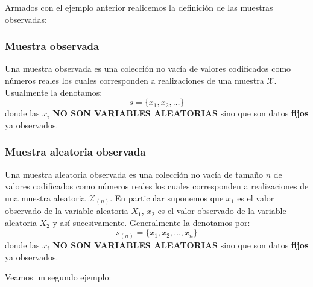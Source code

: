 \documentclass[
]{book}
\newenvironment{Definicion}
{\begin{mdframed}[
  linecolor=definicioncolor,
  skipabove=12pt,
  skipbelow=12pt,
  roundcorner=20pt,
  splittopskip=2\topsep]}
{\end{mdframed}}
\begin{document}
Armados con el ejemplo anterior realicemos la definición de las muestras observadas:

\begin{Definicion}
\hypertarget{muestra-observada}{%
\subsubsection{Muestra observada}\label{muestra-observada}}

Una muestra observada es una colección no vacía de valores codificados
como números reales los cuales corresponden a realizaciones de una
muestra \(\mathcal{X}\). Usualmente la denotamos: \[
s = \{ x_1, x_2, \dots\}
\] donde las \(x_i\) \textbf{NO SON VARIABLES ALEATORIAS} sino que son
datos \textbf{fijos} ya observados.
\end{Definicion}

\begin{Definicion}
\hypertarget{muestra-aleatoria-observada}{%
\subsubsection{Muestra aleatoria
observada}\label{muestra-aleatoria-observada}}

Una muestra aleatoria observada es una colección no vacía de tamaño
\(n\) de valores codificados como números reales los cuales corresponden
a realizaciones de una muestra aleatoria \(\mathcal{X}_{(n)}\). En
particular suponemos que \(x_1\) es el valor observado de la variable
aleatoria \(X_1\), \(x_2\) es el valor observado de la variable
aleatoria \(X_2\) y así sucesivamente. Generalmente la denotamos por: \[
s_{(n)} = \{ x_1, x_2, \dots, x_n\}
\] donde las \(x_i\) \textbf{NO SON VARIABLES ALEATORIAS} sino que son
datos \textbf{fijos} ya observados.
\end{Definicion}

Veamos un segundo ejemplo:
\end{document}
